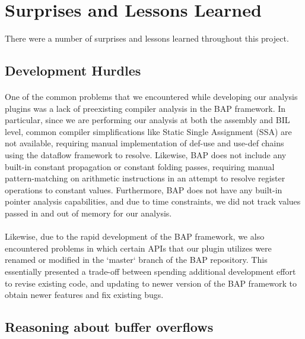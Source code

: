 \documentclass[letterpaper,11pt]{article}
\begin{document}
\section{Surprises and Lessons Learned}
\label{lessonslearned}

There were a number of surprises and lessons learned throughout this project.

\subsection{Development Hurdles}

\paragraph{}
One of the common problems that we encountered while developing our analysis
plugins was a lack of preexisting compiler analysis in the BAP framework. In
particular, since we are performing our analysis at both the assembly and BIL
level, common compiler simplifications like Static Single Assignment (SSA) are
not available, requiring manual implementation of def-use and use-def chains
using the dataflow framework to resolve. Likewise, BAP does not include any
built-in constant propagation or constant folding passes, requiring manual
pattern-matching on arithmetic instructions in an attempt to resolve register
operations to constant values. Furthermore, BAP does not have any built-in
pointer analysis capabilities, and due to time constraints, we did not track
values passed in and out of memory for our analysis.

\paragraph{}
Likewise, due to the rapid development of the BAP framework, we also
encountered problems in which certain APIs that our plugin utilizes were
renamed or modified in the `master` branch of the BAP repository. This
essentially presented a trade-off between spending additional development
effort to revise existing code, and updating to newer version of the BAP
framework to obtain newer features and fix existing bugs.

\subsection{Reasoning about buffer overflows}
\end{document}
